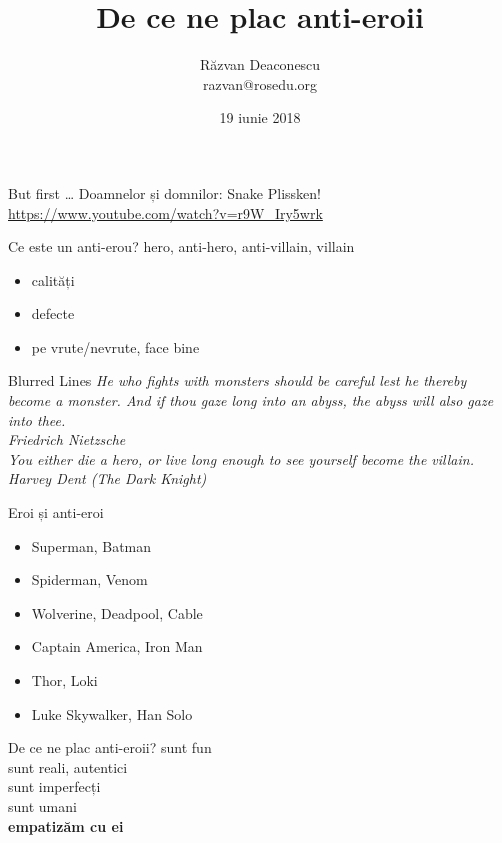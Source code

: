 \documentclass{beamer}
\title[Anti-eroi]{De ce ne plac anti-eroii}
\institute{ROSEdu}
\author[Răzvan Deaconescu]{Răzvan Deaconescu \\
razvan@rosedu.org}
\date{19 iunie 2018}
\begin{document}
\frame{\titlepage}

\begin{frame}{But first \ldots}
  \centering
  \Large
  \pause Doamnelor și domnilor: Snake Plissken! \\
  \normalsize
  \url{https://www.youtube.com/watch?v=r9W_Iry5wrk}
\end{frame}

\begin{frame}{Ce este un anti-erou?}
  \pause hero, anti-hero, anti-villain, villain
  \begin{itemize}
    \pause \item calități
    \pause \item defecte
    \pause \item pe vrute/nevrute, face bine
  \end{itemize}
\end{frame}

\begin{frame}{Blurred Lines}
  \centering
  \pause \textit{He who fights with monsters should be careful lest he thereby become a monster. And if thou gaze long into an abyss, the abyss will also gaze into thee.} \\
  \vspace{3mm}
  \hfill \textit{Friedrich Nietzsche} \\
  \vspace{1cm}
  \pause \textit{You either die a hero, or live long enough to see yourself become the villain.} \\
  \vspace{3mm}
  \hfill \textit{Harvey Dent (The Dark Knight)}
\end{frame}

\begin{frame}{Eroi și anti-eroi}
  \begin{itemize}
    \pause \item Superman, Batman
    \pause \item Spiderman, Venom
    \pause \item Wolverine, Deadpool, Cable
    \pause \item Captain America, Iron Man
    \pause \item Thor, Loki
    \pause \item Luke Skywalker, Han Solo
  \end{itemize}
\end{frame}

\begin{frame}{De ce ne plac anti-eroii?}
  \centering
  \Large
  \pause sunt fun \\
  \pause sunt reali, autentici \\
  \pause sunt imperfecți \\
  \pause sunt umani \\
  \pause \textbf{empatizăm cu ei}
\end{frame}
\end{document}
